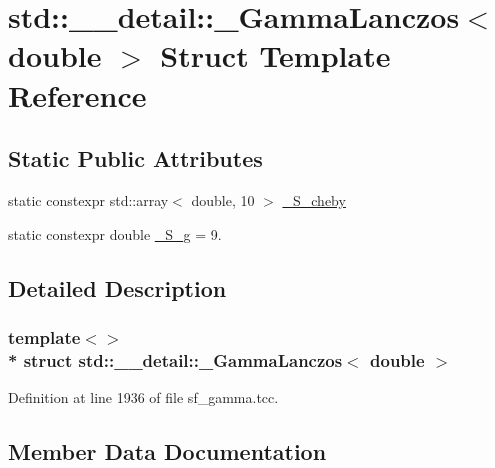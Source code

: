 \hypertarget{structstd_1_1____detail_1_1__GammaLanczos_3_01double_01_4}{}\section{std\+:\+:\+\_\+\+\_\+detail\+:\+:\+\_\+\+Gamma\+Lanczos$<$ double $>$ Struct Template Reference}
\label{structstd_1_1____detail_1_1__GammaLanczos_3_01double_01_4}
\subsection*{Static Public Attributes}
\begin{DoxyCompactItemize}
\item 
static constexpr std\+::array$<$ double, 10 $>$ \hyperlink{structstd_1_1____detail_1_1__GammaLanczos_3_01double_01_4_a6cea35dc57e82b17c764fe3814eeab74}{\+\_\+\+S\+\_\+cheby}
\item 
static constexpr double \hyperlink{structstd_1_1____detail_1_1__GammaLanczos_3_01double_01_4_aee7a7cabdd8c5e91cf63eb2ce00fb7bf}{\+\_\+\+S\+\_\+g} = 9.
\end{DoxyCompactItemize}


\subsection{Detailed Description}
\subsubsection*{template$<$$>$\\*
struct std\+::\+\_\+\+\_\+detail\+::\+\_\+\+Gamma\+Lanczos$<$ double $>$}



Definition at line 1936 of file sf\+\_\+gamma.\+tcc.



\subsection{Member Data Documentation}
